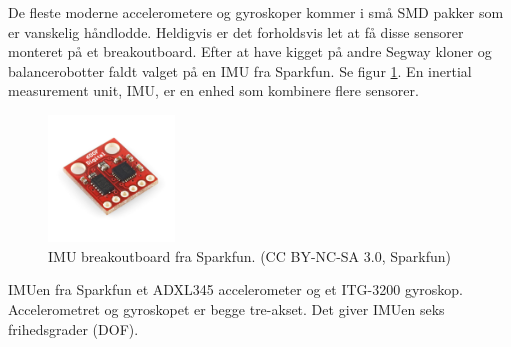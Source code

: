 \documentclass[a4paper,oneside,article,danish,table]{memoir}
\begin{document}
De fleste moderne accelerometere og gyroskoper kommer i små SMD pakker som er vanskelig håndlodde. Heldigvis er det forholdsvis let at få disse sensorer monteret på et breakoutboard. Efter at have kigget på andre Segway kloner og balancerobotter faldt valget på en IMU fra Sparkfun. Se figur \ref{fig:imu}. En inertial measurement unit, IMU, er en enhed som kombinere flere sensorer.
\begin{figure}[htbp]
  \centering
  \includegraphics[width=0.3\textwidth]{pictures/imu.jpg}
  \caption[IMU breakoutboard fra Sparkfun]{IMU breakoutboard fra Sparkfun. (CC BY-NC-SA 3.0, Sparkfun)}
  \label{fig:imu}
\end{figure}
IMUen fra Sparkfun et ADXL345 accelerometer og et ITG-3200 gyroskop. Accelerometret og gyroskopet er begge tre-akset.  Det giver IMUen seks frihedsgrader (DOF).
\end{document}
